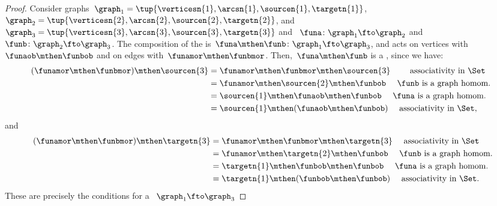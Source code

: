 \begin{proof}
    Consider graphs~$\graph_1=\tup{\verticesn{1},\arcsn{1},\sourcen{1},\targetn{1}}$,~$\graph_2=\tup{\verticesn{2},\arcsn{2},\sourcen{2},\targetn{2}}$, and~$\graph_3=\tup{\verticesn{3},\arcsn{3},\sourcen{3},\targetn{3}}$ and
    ~$\funa \colon \graph_1 \fto \graph_2$ and~$\funb \colon \graph_2 \fto \graph_3$.
    The composition of the  is~$\funa\mthen \funb \colon \graph_1 \fto \graph_3$, and acts on vertices with~$\funaob \mthen \funbob$ and on edges with~$\funamor \mthen \funbmor$.
    Then,~$\funa\mthen \funb$ is a , since we have:
    \begin{equation}
        \begin{aligned}
            (\funamor\mthen \funbmor) \mthen \sourcen{3} & =\funamor\mthen \funbmor \mthen \sourcen{3} \qquad \text{ associativity in \Set} \\
                                                         & =\funamor\mthen \sourcen{2} \mthen \funbob \quad \text{ $\funb$ is a graph homom.
            } \\
                                                         & =\sourcen{1} \mthen \funaob\mthen \funbob \quad \text{ $\funa$ is a graph homom.} \\
                                                         & =\sourcen{1} \mthen (\funaob\mthen \funbob) \quad \text{ associativity in \Set},
        \end{aligned}
    \end{equation}
    and
    \begin{equation}
        \begin{aligned}
            (\funamor \mthen \funbmor) \mthen \targetn{3} & =\funamor \mthen \funbmor \mthen \targetn{3} \quad \text{ associativity in \Set} \\
                                                          & =\funamor \mthen \targetn{2}\mthen \funbob \quad \text{ $\funb$ is a graph homom.} \\
                                                          & =\targetn{1} \mthen \funbob\mthen \funbob \quad \text{ $\funa$ is a graph homom.} \\
                                                          & =\targetn{1} \mthen (\funbob\mthen \funbob)\quad \text{ associativity in \Set}.
        \end{aligned}
    \end{equation}
    These are precisely the conditions for a ~$\graph_1 \fto \graph_3$
\end{proof}
